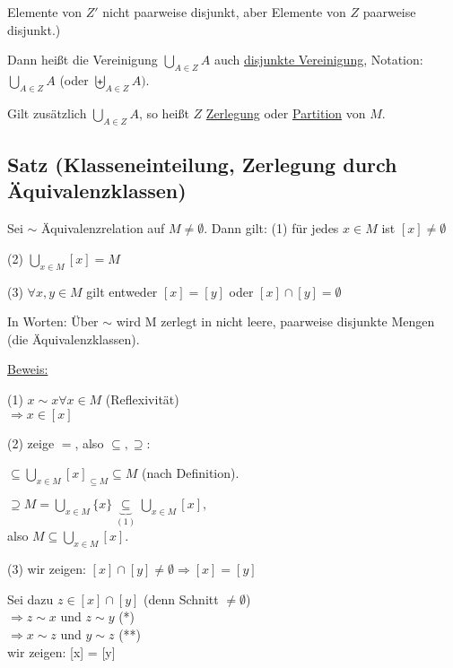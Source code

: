 \documentclass[a4paper, 12pt, twoside] {article}
\begin{document}
Elemente von $Z'$ nicht paarweise disjunkt, aber Elemente von $Z$ paarweise disjunkt.)

Dann heißt die Vereinigung $\displaystyle\bigcup_{A \in Z} A$ auch \underline{disjunkte Vereinigung},
Notation: $\displaystyle\bigcup_{A \in Z} A$ (oder $\displaystyle\biguplus_{A \in Z} A)$.

Gilt zusätzlich $\displaystyle\bigcup_{A \in Z} A$, so heißt $Z$ \underline{Zerlegung} oder \underline{Partition} von $M$.

\subsection{Satz (Klasseneinteilung, Zerlegung durch Äquivalenzklassen)}
Sei $\sim$ Äquivalenzrelation auf $M \neq \emptyset$. Dann gilt:
(1) für jedes $x \in M$ ist $[x] \neq \emptyset$

(2) $\displaystyle\bigcup_{x \in M} [x] = M$

(3) $\forall x, y \in M$ gilt entweder $[x] = [y]$ oder $[x] \cap [y] = \emptyset$

In Worten: Über $\sim$ wird M zerlegt in nicht leere, paarweise disjunkte Mengen (die Äquivalenzklassen).

\underline{Beweis:}

(1) $x \sim x \forall x \in M$ (Reflexivität) \\
$\Rightarrow x \in [x]$

(2) zeige $=$, also $\subseteq, \supseteq$:

$\subseteq \displaystyle\bigcup_{x \in M} [x]_{\subseteq M} \subseteq M$ (nach Definition).

$\supseteq M = \displaystyle\bigcup_{x \in M} \{x\} \underbrace{\subseteq}_{(1)} \displaystyle\bigcup_{x \in M} [x],$ \\
also $M \subseteq \displaystyle\bigcup_{x \in M} [x]$.

(3) wir zeigen: $[x] \cap [y] \neq \emptyset \Rightarrow [x] = [y]$

Sei dazu $z \in [x] \cap [y]$ (denn Schnitt $\neq \emptyset$) \\
$\Rightarrow z \sim x$ und $z \sim y$ (*) \\
$\Rightarrow x \sim z$ und $y \sim z$ (**) \\
wir zeigen: [x] = [y]
\end{document}
